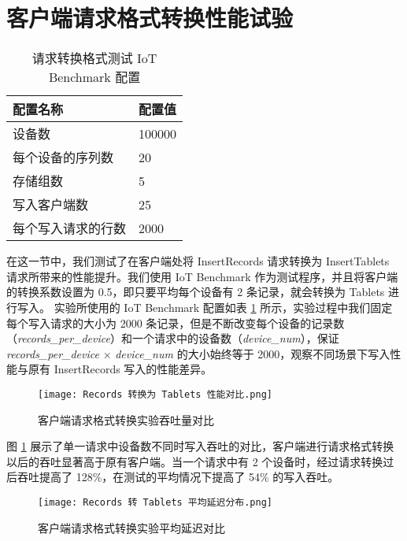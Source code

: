 \section{客户端请求格式转换性能试验}
\begin{table}
  \centering
  \caption{请求转换格式测试 IoT Benchmark 配置}
  \begin{tabular}{ll}
    \toprule
    配置名称 & 配置值 \\
    \midrule 
    设备数 & 100000 \\
    每个设备的序列数 & 20 \\
    存储组数 & 5 \\
    写入客户端数 & 25 \\
    每个写入请求的行数 & 2000 \\
    \bottomrule
  \end{tabular}
  \label{tabular:test-req-format-iot-benchmark-config}
\end{table}
在这一节中，我们测试了在客户端处将 InsertRecords 请求转换为 InsertTablets 请求所带来的性能提升。我们使用 IoT Benchmark 作为测试程序，并且将客户端的转换系数设置为 0.5，即只要平均每个设备有 2 条记录，就会转换为 Tablets 进行写入。
实验所使用的 IoT Benchmark 配置如表 \ref{tabular:test-req-format-iot-benchmark-config} 所示，实验过程中我们固定每个写入请求的大小为 2000 条记录，但是不断改变每个设备的记录数（\emph{records\_per\_device}）和一个请求中的设备数（\emph{device\_num}），保证 \emph{records\_per\_device} $\times$ \emph{device\_num} 的大小始终等于 2000，观察不同场景下写入性能与原有 InsertRecords 写入的性能差异。

\begin{figure}
  \centering
  \texttt{[image: Records 转换为 Tablets 性能对比.png]}
  \caption{客户端请求格式转换实验吞吐量对比}
  \label{fig:records-to-tablets-performance-throughput}
\end{figure}

图 \ref{fig:records-to-tablets-performance-throughput} 展示了单一请求中设备数不同时写入吞吐的对比，客户端进行请求格式转换以后的吞吐显著高于原有客户端。当一个请求中有 2 个设备时，经过请求转换过后吞吐提高了 128\%，在测试的平均情况下提高了 54\% 的写入吞吐。

\begin{figure}
  \centering
  \texttt{[image: Records 转 Tablets 平均延迟分布.png]}
  \caption{客户端请求格式转换实验平均延迟对比} 
  \label{fig:records-to-tablets-performance-avg-latency}
\end{figure}


